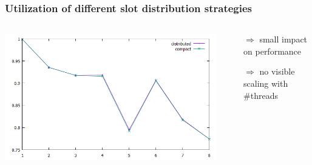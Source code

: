 \documentclass{beamer}
\begin{document}
\begin{frame}
	\frametitle{Utilization of different slot distribution strategies}
	\begin{columns}
		\begin{column}{0.74\textwidth}
			\includegraphics[width=1.0\textwidth]{img/slot_distr.png}
		\end{column}
		\begin{column}{0.26\textwidth}
			\begin{itemize}
				\item[$\Rightarrow$] small impact on performance
				\item[$\Rightarrow$] no visible scaling with \#threads
			\end{itemize}
		\end{column}
	\end{columns}
\end{frame}
\end{document}
